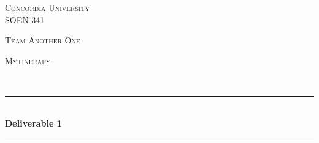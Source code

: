 \documentclass[12pt]{article}
\begin{document}
\begin{titlepage}

\newcommand{\HRule}{\rule{\linewidth}{0.5mm}} %

\center %
 

\textsc{\LARGE Concordia University}\\[1cm] %
\textsc{\Large SOEN 341}\\[1cm] %
\begin{flushleft} 
\end{flushleft}
\begin{minipage}{0.45\textwidth}
\begin{flushleft} \large
\textsc{\large Team Another One }
\end{flushleft}
\end{minipage}
\begin{minipage}{0.45\textwidth}
\begin{flushright} \large
\textsc{\large Mytinerary}
\end{flushright}
\end{minipage}\\[0.5cm]


\HRule \\[0.4cm]
{ \huge \bfseries Deliverable 1}\\[0.4cm] %
\HRule \\[1cm]
 

\end{titlepage}
\end{document}
